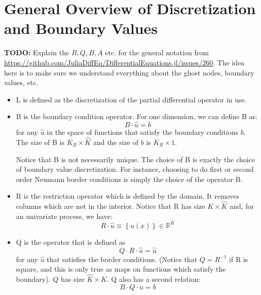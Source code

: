 \documentclass[11pt]{article}
\newcommand{\set}[1]{\ensuremath{\left\{{#1}\right\}}}
\newcommand{\R}{\ensuremath{\mathbb{R}}}
\begin{document}
	\section{General Overview of Discretization and Boundary Values}\label{sec:general}
	\textbf{TODO:} Explain the $R, Q, B, A$ etc. for the general notation from \url{https://github.com/JuliaDiffEq/DifferentialEquations.jl/issues/260}.  The idea here is to make sure we understand everything about the ghost nodes, boundary values, etc.
	\begin{itemize}
		\item L is defined as the discretization of the partial differential operator in use.
		
		\item B is the boundary condition operator. For one dimension, we can define B as:
		\begin{equation}
		B\cdot \hat{u} = b
		\label{B_operator_block}
		\end{equation}
		for any $\hat{u}$ in the space of functions that satisfy the boundary conditions $b$. The size of B is $K_{B} \times \hat{K}$ and the size of $b$ is $K_{B} \times 1$.
		
		Notice that B is not necessarily unique. The choice of B is exactly the choice of boundary value discretization. For instance, choosing to do first or second order Neumann border conditions is simply the choice of the operator B.
		
		\item R is the restriction operator which is defined by the domain. It removes columns which are not in the interior. Notice that R has size $K \times \hat{K}$ and, for an univariate process, we have:
		\begin{equation}
		R\cdot \hat{u}  \equiv\set{u(x)} \in \R^{K} \label{R_operator}
		\end{equation}
		
		\item Q is the operator that is defined as
		\begin{equation}
		Q \cdot R\cdot\hat{u} = \hat{u}\label{Q_operator_1}
		\end{equation}
		for any $\hat{u}$ that satisfies the border conditions. (Notice that $Q = R^{-1}$ if R is square, and this is only true as maps on functions which satisfy the boundary). $Q$ has size $\hat{K} \times K$.
		Q also has a second relation: 
		\begin{equation}
		B\cdot Q\cdot u  = b
		\label{Q_operator_2}
		\end{equation}
		

\end{itemize}
\end{document}
